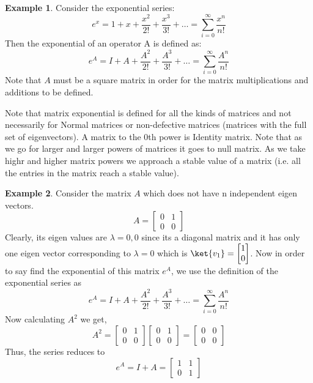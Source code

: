 \documentclass[12pt, oneside]{book}
\theoremstyle{definition}
\theoremstyle{definition}
\newtheorem{example}{Example}[section]
\theoremstyle{remark}
\begin{document}
\begin{example}
    Consider the exponential series:
    \[ e^x=1+x+\dfrac{x^2}{2!}+\dfrac{x^3}{3!}+\ldots = \sum_{i=0}^{\infty} \dfrac{x^n}{n!}\]
    Then the exponential of an operator A is defined as:
    \[ e^A=I+A+\dfrac{A^2}{2!}+\dfrac{A^3}{3!}+\ldots = \sum_{i=0}^{\infty} \dfrac{A^n}{n!}\]
    Note that $A$ must be a square matrix in order for the matrix multiplications and additions to be defined.
\end{example}
Note that matrix exponential is defined for all the kinds of matrices and not necessarily for Normal matrices or non-defective matrices (matrices with the full set of eigenvectors). A matrix to the 0th power is Identity matrix. Note that as we go for larger and larger powers of matrices it goes to null matrix. As we take highr and higher matrix powers we approach a stable value of a matrix (i.e. all the entries in the matrix reach a stable value).
\begin{example}
    Consider the matrix $A$ which does not have n independent eigen vectors.
    \[
    A=\begin{bmatrix} 0 & 1 \\ 0 & 0 \end{bmatrix} 
    \]
    Clearly, its eigen values are $\lambda=0,0$ since its a diagonal matrix and it has only one eigen vector corresponding to $\lambda=0$ which is $\ket{v_1}=\begin{bmatrix} 1 \\ 0 \end{bmatrix}$. Now in order to say find the exponential of this matrix $e^A$, we use the definition of the exponential series as
    \[
    e^A=I+A+\dfrac{A^2}{2!}+\dfrac{A^3}{3!}+\ldots = \sum_{i=0}^{\infty} \dfrac{A^n}{n!}
    \]
    Now calculating $A^2$ we get,
    \[
    A^2=\begin{bmatrix} 0 & 1 \\ 0 & 0 \end{bmatrix}\begin{bmatrix} 0 & 1 \\ 0 & 0 \end{bmatrix}=\begin{bmatrix} 0 & 0 \\ 0 & 0 \end{bmatrix}
    \]
    Thus, the series reduces to
    \[
    e^A=I+A=\begin{bmatrix} 1 & 1 \\ 0 & 1 \end{bmatrix}
    \]
\end{example}
\end{document}
